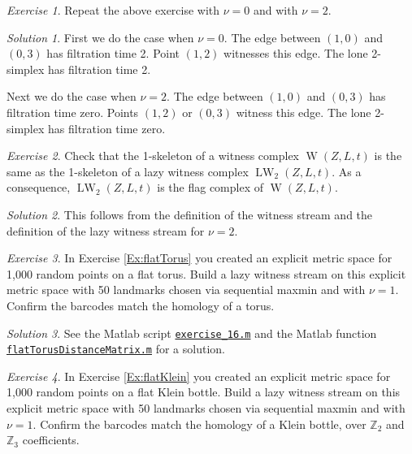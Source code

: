 \documentclass[amscd, amssymb, verbatim]{amsart}[12pt]
\theoremstyle{remark}
\theoremstyle{remark}
\newtheorem{exerciseSol}{Exercise}
\theoremstyle{remark}
\newtheorem*{solution}{Solution}
\DeclareMathOperator{\W}{W}
\DeclareMathOperator{\LW}{LW}
\begin{document}
\begin{exerciseSol}
Repeat the above exercise with $\nu = 0$ and with $\nu = 2$.
\end{exerciseSol}

\begin{solution}
First we do the case when $\nu = 0$. The edge between $(1, 0)$ and $(0, 3)$ has filtration time 2. Point $(1, 2)$ witnesses this edge. The lone 2-simplex has filtration time 2. 

Next we do the case when $\nu = 2$. The edge between $(1, 0)$ and $(0, 3)$ has filtration time zero. Points $(1, 2)$ or $(0, 3)$ witness this edge. The lone 2-simplex has filtration time zero. 
\end{solution}

\begin{exerciseSol}
Check that the 1-skeleton of a witness complex $\W(Z,L,t)$ is the same as the 1-skeleton of a lazy witness complex $\LW_2(Z,L,t)$. As a consequence, $\LW_2(Z,L,t)$ is the flag complex of $\W(Z,L,t)$.
\end{exerciseSol}

\begin{solution}
This follows from the definition of the witness stream and the definition of the lazy witness stream for $\nu = 2$. 
\end{solution}

\begin{exerciseSol}
In Exercise \ref{Ex:flatTorus} you created an explicit metric space for 1,000 random points on a flat torus. Build a lazy witness stream on this explicit metric space with 50 landmarks chosen via sequential maxmin and with $\nu = 1$.  Confirm the barcodes match the homology of a torus. 
\end{exerciseSol}

\begin{solution}
See the Matlab script \href{https://github.com/appliedtopology/javaplex/tree/master/src/matlab/for_distribution/tutorial_solutions/exercise_16.m}{\texttt{exercise\_16.m}} and the Matlab function \href{https://github.com/appliedtopology/javaplex/tree/master/src/matlab/for_distribution/tutorial_solutions/flatTorusDistanceMatrix.m}{\texttt{flatTorusDistanceMatrix.m}} for a solution.
\end{solution}

\begin{exerciseSol}
In Exercise \ref{Ex:flatKlein} you created an explicit metric space for 1,000 random points on a flat Klein bottle. Build a lazy witness stream on this explicit metric space with 50 landmarks chosen via sequential maxmin and with $\nu = 1$.  Confirm the barcodes match the homology of a Klein bottle, over $\mathbb{Z}_2$ and $\mathbb{Z}_3$ coefficients.
\end{exerciseSol}
\end{document}
